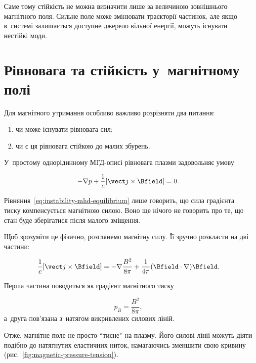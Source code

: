 Саме тому стійкість не можна визначити лише за величиною
зовнішнього магнітного поля. Сильне поле може змінювати траєкторії
частинок, але якщо в~системі залишається доступне джерело вільної
енергії, можуть існувати нестійкі моди.

\section{Рівновага та стійкість у~магнітному полі}

Для магнітного утримання особливо важливо розрізняти два питання:

\begin{enumerate}
\item чи може існувати рівновага сил;
\item чи є ця рівновага стійкою до малих збурень.
\end{enumerate}

У~простому однорідинному МГД-описі рівновага плазми задовольняє
умову

\begin{equation}
-\nabla p+\frac{1}{c}[\vect j\times\Bfield]=0.
\label{eq:instability-mhd-equilibrium}
\end{equation}

Рівняння~\eqref{eq:instability-mhd-equilibrium} лише говорить, що
сила градієнта тиску компенсується магнітною силою. Воно ще нічого
не говорить про те, що стан буде зберігатися після малого зміщення.

Щоб зрозуміти це фізично, розглянемо магнітну силу. Її зручно
розкласти на дві частини:

\begin{equation}
\frac{1}{c}[\vect j\times\Bfield]
=
-\nabla\frac{B^2}{8\pi}
+
\frac{1}{4\pi}(\Bfield\cdot\nabla)\Bfield.
\label{eq:instability-magnetic-force}
\end{equation}

Перша частина поводиться як градієнт магнітного тиску

\begin{equation}
p_B=\frac{B^2}{8\pi},
\label{eq:instability-magnetic-pressure}
\end{equation}
%
а~друга пов'язана з~натягом викривлених силових ліній.

Отже, магнітне поле не просто \enquote{тисне} на плазму. Його силові
лінії можуть діяти подібно до натягнутих еластичних ниток, намагаючись
зменшити свою кривину (рис.~\ref{fig:magnetic-pressure-tension}).

